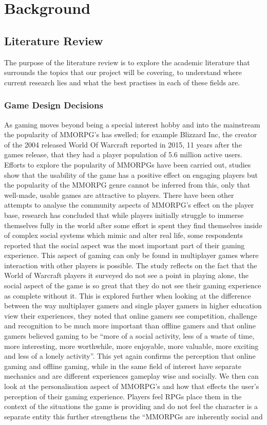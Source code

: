 \documentclass{article}
\begin{document}
	\section{Background}
	\subsection{Literature Review}
	The purpose of the literature review is to explore the academic literature that surrounds the topics that our project will be covering, to understand where current research lies and what the best practises in each of these fields are.
	\subsubsection{Game Design Decisions}
	As gaming moves beyond being a special interest hobby and into the mainstream the popularity of MMORPG’s has swelled; for example Blizzard Inc, the creator of the 2004 released World Of Warcraft reported in 2015, 11 years after the games release, that they had a player population of 5.6 million active users. Efforts to explore the popularity of MMORPGs have been carried out\cite{Christou:2012:EPP:2367616.2367630}, studies show that the usability of the game has a positive effect on engaging players but the popularity of the MMORPG genre cannot be inferred from this, only that well-made, usable games are attractive to players. There have been other attempts to analyse the community aspects of MMORPG’s effect on the player base\cite{DoThoseWhoPlay}, research has concluded that while players initially struggle to immerse themselves fully in the world after some effort is spent they find themselves inside of complex social systems which mimic and alter real life, some respondents reported that the social aspect was the most important part of their gaming experience. This aspect of gaming can only be found in multiplayer games where interaction with other players is possible. The study reflects on the fact that the World of Warcraft players it surveyed do not see a point in playing alone, the social aspect of the game is so great that they do not see their gaming experience as complete without it. This is explored further when looking at the\cite{Hainey:2011:DMO:2304793.2305216} difference between the way multiplayer gamers and single player gamers in higher education view their experiences, they noted that online gamers see competition, challenge and recognition to be much more important than offline gamers and that online gamers believed gaming to be “more of a social activity, less of a waste of time, more interesting, more worthwhile, more enjoyable, more valuable, more exciting and less of a lonely activity”. This yet again confirms the perception that online gaming and offline gaming, while in the same field of interest have separate mechanics and are different experiences gameplay wise and socially. We then can look at the personalisation aspect of MMORPG’s and how that effects the user’s perception of their gaming experience. Players feel RPGs place them in the context of the situations the game is providing and do not feel the character is a separate entity\cite{bowman:2012:EPP:2367616.2367630} this further strengthens the “MMORPGs are inherently social and 
\end{document}
